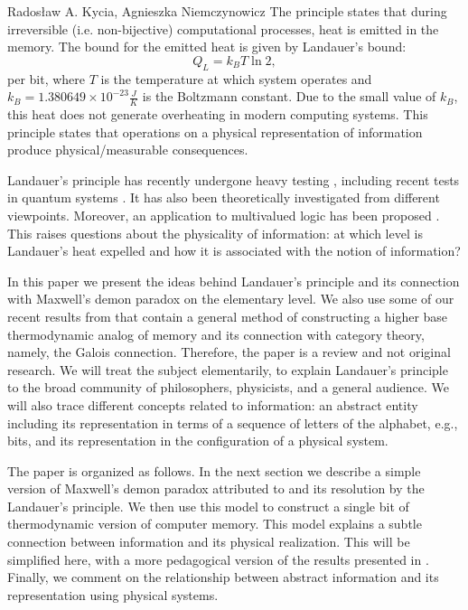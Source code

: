 \begin{artengenv2auth}{Rados\l aw A. Kycia, Agnieszka Niemczynowicz}
The principle states that during irreversible (i.e. non-bijective) computational processes,  heat is emitted in the memory. The bound for the emitted heat is given by Landauer's bound:
\begin{equation}
 Q_{L}=k_{B}T\ln{2},
 \label{Eq.LandauersBound}
\end{equation}
per bit, where $T$ is the temperature at which system operates and $k_{B}=1.380649\times 10^{-23} \frac{J}{K}$ is the Boltzmann constant. Due to the small value of $k_{B}$, this heat does not generate overheating in modern computing systems. This principle states that operations on a physical representation of information produce physical/measurable consequences.

Landauer's principle has recently undergone heavy testing \parencite{LandauerMeasurment}, including recent tests in quantum systems \parencite{QuantumLandauer}. It has also been theoretically investigated \parencites{LandauerExplained, LandauerExplainedFull, Piechocinska, ThermodynamicCostOfDataProcessing, KyciaLandauer, KyciaLandauer2} from different viewpoints. Moreover, an application to multivalued logic has been proposed \parencites{TritLandauer, KyciaNiemczynowicz}. This raises questions about the physicality of information: at which level is Landauer's heat expelled and how it is associated with the notion of information?

In this paper we present the ideas behind Landauer's principle and its connection with Maxwell's demon paradox on the elementary level. We also use some of our recent results from \parencite{KyciaNiemczynowicz} that contain a general method of constructing a higher base thermodynamic analog of memory and its connection with category theory, namely, the Galois connection. Therefore, the paper is a review and not original research. We will treat the subject elementarily, to explain Landauer's principle to the broad community of philosophers, physicists, and a general audience. We will also trace different concepts related to information: an abstract entity including its representation in terms of a sequence of letters of the alphabet, e.g., bits, and its representation in the configuration of a physical system.

The paper is organized as follows. In the next section we describe a simple version of Maxwell's demon paradox attributed to  \textcite{Szilard} and its resolution by the Landauer's principle. We then use this model to construct a single bit of thermodynamic version of computer memory. This model explains a subtle connection between information and its physical realization. This will be simplified here, with a more pedagogical version of the results presented in \parencite{KyciaNiemczynowicz}. Finally, we comment on the relationship between abstract information and its representation using physical systems. 



\end{artengenv2auth}
